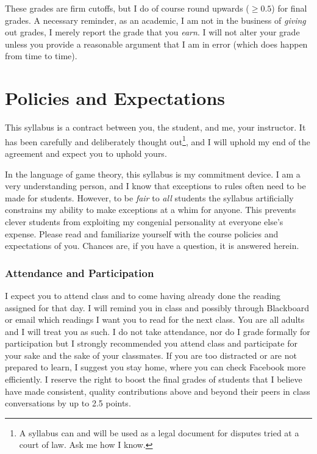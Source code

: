 \documentclass{article}
\begin{document}
These grades are firm cutoffs, but I do of course round upwards
(\(\geq 0.5\)) for final grades. A necessary reminder, as an academic, I
am not in the business of \emph{giving} out grades, I merely report the
grade that you \emph{earn}. I will not alter your grade unless you
provide a reasonable argument that I am in error (which does happen from
time to time).

\hypertarget{policies-and-expectations}{%
\section{Policies and Expectations}\label{policies-and-expectations}}

This syllabus is a contract between you, the student, and me, your
instructor. It has been carefully and deliberately thought out\footnote{A
  syllabus can and will be used as a legal document for disputes tried
  at a court of law. Ask me how I know.}, and I will uphold my end of
the agreement and expect you to uphold yours.

In the language of game theory, this syllabus is my commitment device. I
am a very understanding person, and I know that exceptions to rules
often need to be made for students. However, to be \emph{fair} to
\emph{all} students the syllabus artificially constrains my ability to
make exceptions at a whim for anyone. This prevents clever students from
exploiting my congenial personality at everyone else's expense. Please
read and familiarize yourself with the course policies and expectations
of you. Chances are, if you have a question, it is answered herein.

\hypertarget{attendance-and-participation}{%
\subsubsection{Attendance and
Participation}\label{attendance-and-participation}}

I expect you to attend class and to come having already done the reading
assigned for that day. I will remind you in class and possibly through
Blackboard or email which readings I want you to read for the next
class. You are all adults and I will treat you as such. I do not take
attendance, nor do I grade formally for participation but I strongly
recommended you attend class and participate for your sake and the sake
of your classmates. If you are too distracted or are not prepared to
learn, I suggest you stay home, where you can check Facebook more
efficiently. I reserve the right to boost the final grades of students
that I believe have made consistent, quality contributions above and
beyond their peers in class conversations by up to 2.5 points.
\end{document}
